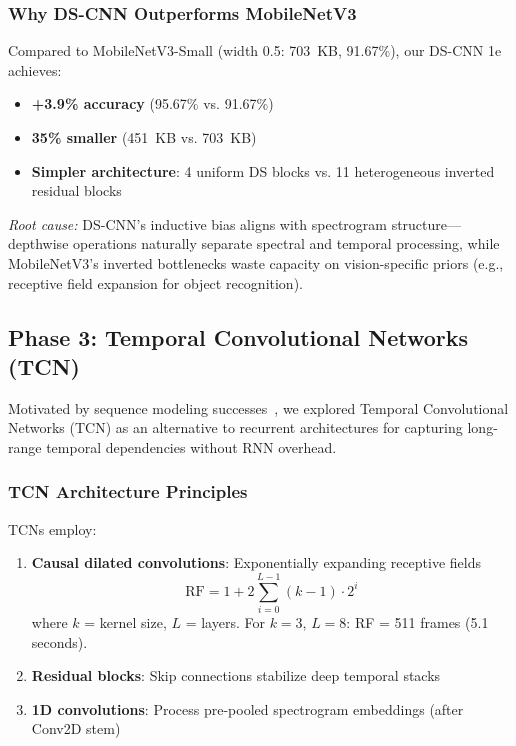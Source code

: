 \documentclass[10pt,a4paper,twoside]{article}
\begin{document}
\subsubsection{Why DS-CNN Outperforms MobileNetV3}

Compared to MobileNetV3-Small (width 0.5: 703~KB, 91.67\%), our DS-CNN 1e achieves:
\begin{itemize}
	\item \textbf{+3.9\% accuracy} (95.67\% vs. 91.67\%)
	\item \textbf{35\% smaller} (451~KB vs. 703~KB)
	\item \textbf{Simpler architecture}: 4 uniform DS blocks vs. 11 heterogeneous inverted residual blocks
\end{itemize}

\noindent\textit{Root cause:} DS-CNN's inductive bias aligns with spectrogram structure—depthwise operations naturally separate spectral and temporal processing, while MobileNetV3's inverted bottlenecks waste capacity on vision-specific priors (e.g., receptive field expansion for object recognition).

\subsection{Phase 3: Temporal Convolutional Networks (TCN)}
\label{sec:phase3}

Motivated by sequence modeling successes~\cite{bai2018empirical}, we explored Temporal Convolutional Networks (TCN) as an alternative to recurrent architectures for capturing long-range temporal dependencies without RNN overhead.

\subsubsection{TCN Architecture Principles}

TCNs employ:
\begin{enumerate}
	\item \textbf{Causal dilated convolutions}: Exponentially expanding receptive fields
	\begin{equation}
		\text{RF} = 1 + 2 \sum_{i=0}^{L-1} (k-1) \cdot 2^i
	\end{equation}
	where $k$ = kernel size, $L$ = layers. For $k=3$, $L=8$: RF = 511 frames (5.1 seconds).

	\item \textbf{Residual blocks}: Skip connections stabilize deep temporal stacks

	\item \textbf{1D convolutions}: Process pre-pooled spectrogram embeddings (after Conv2D stem)
\end{enumerate}
\end{document}
